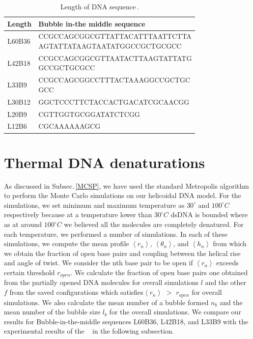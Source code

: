 \documentclass[12pt,masters,final]{UTRGVthesis}
\begin{document}
%
\begin{table} [!h]
\centering  
\begin{tabular}{ | l | l |} 
    \hline
    Length & Bubble in-the middle sequence \\ \hline
    L60B36 &\makecell{CCGCCAGCGGCGTTATTACATTTAATTCTTA\\
    AGTATTATAAGTAATATGGCCGCTGCGCC}  \\ \hline
    L42B18 & \makecell{CCGCCAGCGGCGTTAATACTTAAGTATTATG\\
    GCCGCTGCGCC} \\ \hline
    L33B9  &\makecell{CCGCCAGCGGCCTTTACTAAAGGCCGCTGC\\
    GCC}  \\ \hline
    L30B12 &GGCTCCCTTCTACCACTGACATCGCAACGG  \\ \hline
    L20B9  &CGTTGGTGCGGATATCTCGG \\ \hline
    L12B6  &CGCAAAAAAGCG \\ \hline
    \hline
    \end{tabular}
    \caption{Length of DNA sequence\,.}
    \label{table_length_sequence}
    \end{table}
%
\section{Thermal DNA denaturations}
As discussed in Subsec.\,\ref{MCSP}, we have used the standard Metropolis algorithm to perform the Monte Carlo simulations on our helicoidal DNA model. For the simulations, we set minimum and maximum temperature as $30^\circ$  and $100^\circ C$ respectively because at a temperature lower than $30^\circ C$ dsDNA is bounded where as at around $100^\circ C$ we believed all the molecules are completely denatured. For each temperature, we performed a number of simulations. In each of these simulations, we compute the mean profile $\left< r_{n} \right>$, $\left< \theta_{n} \right>$, and $\left< h_{n}\right>$ from which we obtain the fraction of open base pairs and coupling between the helical rise and angle of twist. We consider  the nth base pair to be open if $\left< r_{n} \right>$ exceeds certain threshold $r_{open}$. We calculate the fraction of open base pairs one obtained from the partially opened DNA molecules for overall simulations $l$ and the other $f$ from the saved configurations which satisfies$\left< r_{n} \right>$ $>$ $r_{open}$ for overall simulations. We also calculate the mean number of a bubble formed $n_{b}$ and the mean number of the bubble size $l_b$ for the overall simulations. We compare our results for Bubble-in-the-middle sequences L60B36, L42B18, and L33B9 with the experimental results of the ~\cite{zeng2003length,zeng2004bubble} in the following subsection.
\newpage
\end{document}
